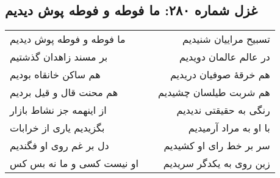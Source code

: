 \begin{center}
\section*{غزل شماره ۲۸۰: ما فوطه و فوطه پوش دیدیم}
\label{sec:280}
\begin{longtable}{l p{0.5cm} r}
ما فوطه و فوطه پوش دیدیم
&&
تسبیح مراییان شنیدیم
\\
بر مسند زاهدان گذشتیم
&&
در عالم عالمان دویدیم
\\
هم ساکن خانقاه بودیم
&&
هم خرقهٔ صوفیان دریدیم
\\
هم محنت قال و قیل بردیم
&&
هم شربت طیلسان چشیدیم
\\
از اینهمه جز نشاط بازار
&&
رنگی به حقیقتی ندیدیم
\\
بگزیدیم یاری از خرابات
&&
با او به مراد آرمیدیم
\\
دل بر غم روی او فگندیم
&&
سر بر خط رای او کشیدیم
\\
او نیست کسی و ما نه بس کس
&&
زین روی به یکدگر سریدیم
\\
\end{longtable}
\end{center}
